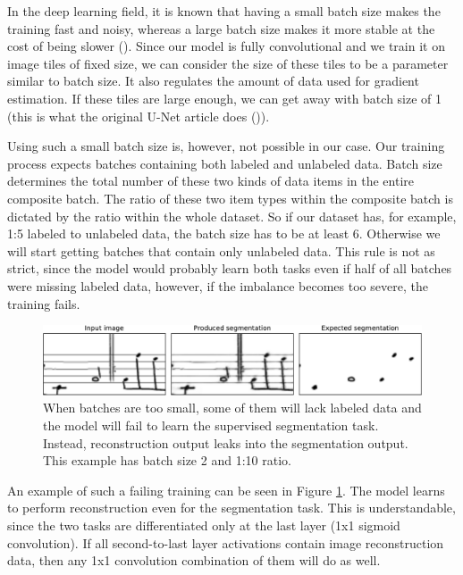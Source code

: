 In the deep learning field, it is known that having a small batch size makes the training fast and noisy, whereas a large batch size makes it more stable at the cost of being slower (\cite{DeepLearningBook}). Since our model is fully convolutional and we train it on image tiles of fixed size, we can consider the size of these tiles to be a parameter similar to batch size. It also regulates the amount of data used for gradient estimation. If these tiles are large enough, we can get away with batch size of 1 (this is what the original U-Net article does (\cite{UNet})).

Using such a small batch size is, however, not possible in our case. Our training process expects batches containing both labeled and unlabeled data. Batch size determines the total number of these two kinds of data items in the entire composite batch. The ratio of these two item types within the composite batch is dictated by the ratio within the whole dataset. So if our dataset has, for example, 1:5 labeled to unlabeled data, the batch size has to be at least 6. Otherwise we will start getting batches that contain only unlabeled data. This rule is not as strict, since the model would probably learn both tasks even if half of all batches were missing labeled data, however, if the imbalance becomes too severe, the training fails.

\begin{figure}[ht]
    \centering
    \includegraphics[width=145mm]{../../figures/07-small-batches/small-batches.pdf}
    \caption{When batches are too small, some of them will lack labeled data and the model will fail to learn the supervised segmentation task. Instead, reconstruction output leaks into the segmentation output. This example has batch size 2 and 1:10 ratio.}
    \label{fig:SmallBatches}
\end{figure}

An example of such a failing training can be seen in Figure \ref{fig:SmallBatches}. The model learns to perform reconstruction even for the segmentation task. This is understandable, since the two tasks are differentiated only at the last layer (1x1 sigmoid convolution). If all second-to-last layer activations contain image reconstruction data, then any 1x1 convolution combination of them will do as well.

